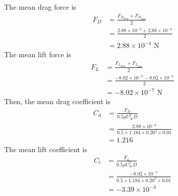 The mean drag force is
\begin{align*}
    F_D &= \frac{F_{D_{\text{max}}} + F_{D_{\text{min}}}}{2} \\
    &= \frac{2.88\times10^{-4} + 2.88\times10^{-4}}{2} \\
    &= \boxed{2.88\times10^{-4} \text{ N}}
\end{align*}
The mean lift force is
\begin{align*}
    F_L &= \frac{F_{L_{\text{max}}} + F_{L_{\text{min}}}}{2} \\
    &= \frac{-8.02\times10^{-7} - 8.02\times10^{-7}}{2} \\
    &= \boxed{-8.02\times10^{-7} \text{ N}}
\end{align*}
Then, the mean drag coefficient is
\begin{align*}
    C_d &= \frac{F_D}{0.5\rho U_\infty^2 D} \\
    &= \frac{2.88\times10^{-4}}{0.5 \times 1.184 \times 0.20^2 \times 0.01} \\
    &= \boxed{1.216}
\end{align*}
The mean lift coefficient is
\begin{align*}
    C_l &= \frac{F_L}{0.5\rho U_\infty^2 D} \\
    &= \frac{-8.02\times10^{-7}}{0.5 \times 1.184 \times 0.20^2 \times 0.01} \\
    &= \boxed{-3.39\times10^{-3}}
\end{align*}

